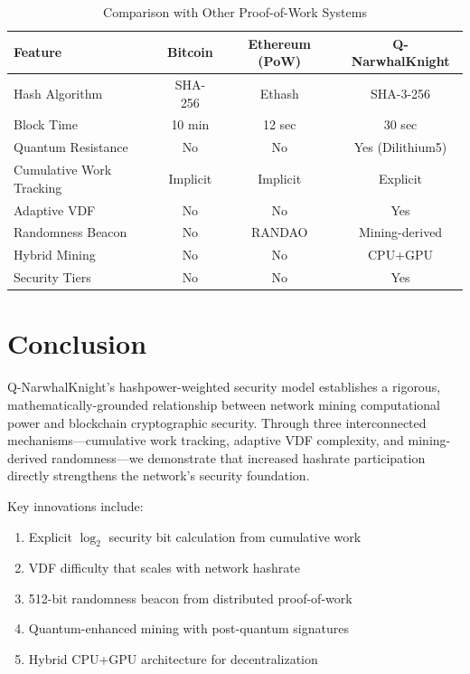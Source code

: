 \documentclass[11pt,a4paper]{article}
\begin{document}
\begin{table}[h]
\centering
\caption{Comparison with Other Proof-of-Work Systems}
\begin{tabular}{lccc}
\toprule
\textbf{Feature} & \textbf{Bitcoin} & \textbf{Ethereum (PoW)} & \textbf{Q-NarwhalKnight} \\
\midrule
Hash Algorithm & SHA-256 & Ethash & SHA-3-256 \\
Block Time & 10 min & 12 sec & 30 sec \\
Quantum Resistance & No & No & Yes (Dilithium5) \\
Cumulative Work Tracking & Implicit & Implicit & Explicit \\
Adaptive VDF & No & No & Yes \\
Randomness Beacon & No & RANDAO & Mining-derived \\
Hybrid Mining & No & No & CPU+GPU \\
Security Tiers & No & No & Yes \\
\bottomrule
\end{tabular}
\end{table}

\section{Conclusion}

Q-NarwhalKnight's hashpower-weighted security model establishes a rigorous, mathematically-grounded relationship between network mining computational power and blockchain cryptographic security. Through three interconnected mechanisms---cumulative work tracking, adaptive VDF complexity, and mining-derived randomness---we demonstrate that increased hashrate participation directly strengthens the network's security foundation.

Key innovations include:
\begin{enumerate}
    \item Explicit $\log_2$ security bit calculation from cumulative work
    \item VDF difficulty that scales with network hashrate
    \item 512-bit randomness beacon from distributed proof-of-work
    \item Quantum-enhanced mining with post-quantum signatures
    \item Hybrid CPU+GPU architecture for decentralization
\end{enumerate}
\end{document}
